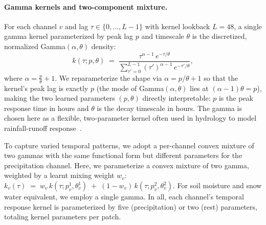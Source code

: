 \paragraph{Gamma kernels and two-component mixture.}
For each channel $v$ and lag $\tau \in \{0, \ldots, L{-}1\}$ with kernel lookback $L = 48$, a single gamma kernel parameterized by peak lag $p$ and timescale $\theta$ is the discretized, normalized Gamma$(\alpha, \theta)$ density: 
\[k(\tau; p, \theta) \;=\; \frac{\tau^{\alpha - 1}\, e^{-\tau/\theta}}{\sum_{\tau'=0}^{L-1} (\tau')^{\alpha - 1}\, e^{-\tau'/\theta}},\] where $\alpha = \tfrac{p}{\theta} + 1$.
We reparameterize the shape via $\alpha = p/\theta + 1$ so that the kernel's peak lag is exactly $p$ (the mode of Gamma$(\alpha, \theta)$ lies at $(\alpha - 1)\theta = p$), making the two learned parameters $(p, \theta)$ directly interpretable: $p$ is the peak response time in hours and $\theta$ is the decay timescale in hours. 
%
%
The gamma is chosen here as a flexible, two-parameter kernel often used in hydrology to model rainfall-runoff response~\cite{nash_systematic_1959}.

To capture varied temporal patterns, we adopt a per-channel convex mixture of two gammas with the same functional form but different parameters for the precipitation channel.
%
Here, we parameterize a convex mixture of two gamma, weighted by a learnt mixing weight $w_v$: $k_v(\tau) \;=\; w_v\, k(\tau; p^{\text{1}}_v, \theta^{\text{1}}_v) \;+\; (1 - w_v)\, k(\tau; p^{\text{2}}_v, \theta^{\text{2}}_v)$.
%
For soil moisture and snow water equivalent, we employ a single gamma.
%
% 
%
In all, each channel's temporal response kernel is parameterized by five (precipitation) or two (rest) parameters, totaling  kernel parameters per patch.

